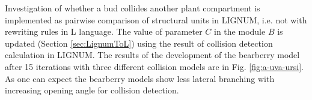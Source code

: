Investigation of  whether a bud collides another  plant compartment is
implemented as pairwise comparison of structural units in LIGNUM, i.e.
not with rewriting rules in L language.  The value of parameter $C$ in
the  module $B$  is  updated (Section  \ref{sec:LignumToL}) using  the
result of  collision detection calculation in LIGNUM.   The results of
the development of the bearberry  model after 15 iterations with three
different collision models are  in Fig.  \ref{fig:a-uva-ursi}.  As one
can  expect the  bearberry  models show  less  lateral branching  with
increasing opening angle for collision detection.
 

















